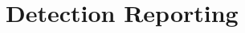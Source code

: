 \documentclass[a4paper,fleqn,usenatbib]{mnras}
\begin{document}
%
%

\section{Detection Reporting}

\end{document}

